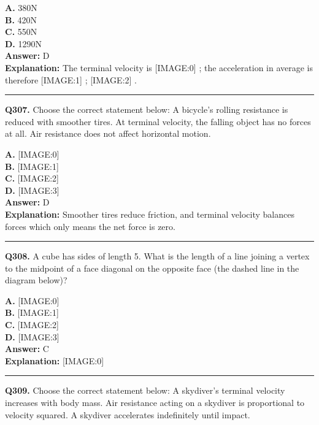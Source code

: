 \documentclass[12pt]{article}
\begin{document}
\textbf{A.} 380N \\
\textbf{B.} 420N \\
\textbf{C.} 550N \\
\textbf{D.} 1290N \\

\textbf{Answer:} D \\
\textbf{Explanation:} The terminal velocity is
[IMAGE:0]
; the acceleration in average is therefore
[IMAGE:1]
;
[IMAGE:2]
.

\hrule
\vspace{1em}


\noindent
\textbf{Q307.} Choose the correct statement below:
A bicycle’s rolling resistance is reduced with smoother tires.
At terminal velocity, the falling object has no forces at all.
Air resistance does not affect horizontal motion.



\textbf{A.} [IMAGE:0] \\
\textbf{B.} [IMAGE:1] \\
\textbf{C.} [IMAGE:2] \\
\textbf{D.} [IMAGE:3] \\

\textbf{Answer:} D \\
\textbf{Explanation:} Smoother tires reduce friction, and terminal velocity balances forces which only means the net force is zero.

\hrule
\vspace{1em}


\noindent
\textbf{Q308.} A cube has sides of length 5. What is the length of a line joining a vertex to the midpoint of a face diagonal on the opposite face (the dashed line in the diagram below)?



\textbf{A.} [IMAGE:0] \\
\textbf{B.} [IMAGE:1] \\
\textbf{C.} [IMAGE:2] \\
\textbf{D.} [IMAGE:3] \\

\textbf{Answer:} C \\
\textbf{Explanation:} [IMAGE:0]

\hrule
\vspace{1em}


\noindent
\textbf{Q309.} Choose the correct statement below:
A skydiver’s terminal velocity increases with body mass.
Air resistance acting on a skydiver is proportional to velocity squared.
A skydiver accelerates indefinitely until impact.
\end{document}
